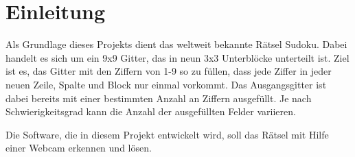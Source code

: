 
\section{Einleitung}
Als Grundlage dieses Projekts dient das weltweit bekannte Rätsel Sudoku. Dabei handelt es sich um ein 9x9 Gitter, das in neun 3x3 Unterblöcke unterteilt ist.
Ziel ist es, das Gitter mit den Ziffern von 1-9 so zu füllen, dass jede Ziffer in jeder neuen Zeile, Spalte und Block nur einmal vorkommt.
Das Ausgangsgitter ist dabei bereits mit einer bestimmten Anzahl an Ziffern ausgefüllt. Je nach Schwierigkeitsgrad kann die Anzahl der ausgefüllten Felder variieren.

Die Software, die in diesem Projekt entwickelt wird, soll das Rätsel mit Hilfe einer Webcam erkennen und lösen.
